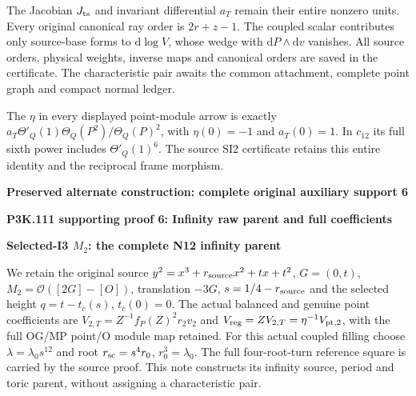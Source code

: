 The Jacobian \(J_{\rm ts}\) and invariant differential \(a_T\) remain their
entire nonzero units. Every original canonical ray order is
\(2r+z-1\). The coupled scalar contributes only source-base forms
to \(\mathrm d\log V\), whose wedge with \(\mathrm dP\wedge \mathrm dv\) vanishes. All source orders,
physical weights, inverse maps and canonical orders are saved
in the certificate. The characteristic pair awaits the common
attachment, complete point graph and compact normal ledger.

The \(\eta\) in every displayed point-module arrow is exactly
\(a_T \Theta'_Q(1) \Theta_Q(P^{2})/\Theta_Q(P)^{2}\), with \(\eta(0)=-1\)
and \(a_T(0)=1\). In \(c_{12}\) its full sixth power includes
\(\Theta'_Q(1)^{6}\). The source SI2 certificate retains this entire
identity and the reciprocal frame morphism.






\par\bigskip\noindent\textbf{Preserved alternate construction: complete original auxiliary support 6}\par
\par\bigskip\noindent\textbf{P3K.111 supporting proof 6: Infinity raw parent and full coefficients}\par\nobreak
\par

\medskip\noindent\textbf{Selected-I3 \(M_{2}\): the complete N12 infinity parent}

\par\nobreak

We retain the original source \(y^{2}=x^{3}+r_{\rm source} x^{2}+t x+t^{2}\), \(G=(0,t)\),
\(M_{2}=\mathcal O([2G]-[O])\), translation \(-3G\), \(s=1/4-r_{\rm source}\) and the selected
height \(q=t-t_c(s)\), \(t_c(0)=0\). The actual balanced and genuine point coefficients are
\(V_{2,T}=Z^{-1} f_P(Z)^{2} r_{2} v_{2}\) and
\(V_{\rm reg}=Z V_{2,T}=\eta^{-1} V_{{\rm pt},2}\), with the full OG/MP point/O module
map retained. For this actual coupled
filling choose \(\lambda=\lambda_0 s^{12}\) and root \(r_{\rm sc}=s^{4} r_{0}\),
\(r_{0}^{3}=\lambda_0\). The full four-root-turn reference square is carried
by the source proof. This note constructs its infinity source,
period and toric parent, without assigning a characteristic pair.

\par

